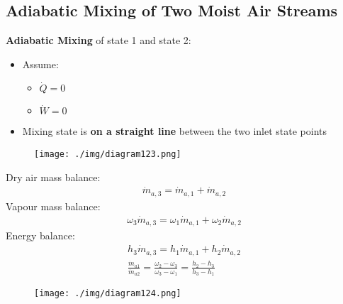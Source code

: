 \subsection{Adiabatic Mixing of Two Moist Air Streams}
\textbf{Adiabatic Mixing} of state 1 and state 2:
\begin{itemize}[noitemsep]
  \item Assume:
        \begin{itemize}[noitemsep]
          \item $\dot{Q} = 0$
          \item $\dot{W} = 0$
        \end{itemize}
  \item Mixing state is \textbf{on a straight line} between the two inlet state points
\end{itemize}
\begin{figure}[H]
  \centering
  \texttt{[image: ./img/diagram123.png]}
  \caption{}
\end{figure}
Dry air mass balance:
\begin{gather}
  \dot{m}_{a,3} = \dot{m}_{a,1} + \dot{m}_{a,2}
\end{gather}
Vapour mass balance:
\begin{gather}
  \omega_3\dot{m}_{a,3} = \omega_1\dot{m}_{a,1} + \omega_2\dot{m}_{a,2}
\end{gather}
Energy balance:
\begin{gather}
  h_3\dot{m}_{a,3} = h_1\dot{m}_{a,1} + h_2\dot{m}_{a,2} \\[5pt]
  \frac{\dot{m}_{a1}}{\dot{m}_{a2}} = \frac{\omega_2-\omega_3}{\omega_3-\omega_1} = \frac{h_2-h_3}{h_3-h_1}
\end{gather}
\begin{figure}[H]
  \centering
  \texttt{[image: ./img/diagram124.png]}
  \caption{}
\end{figure}
